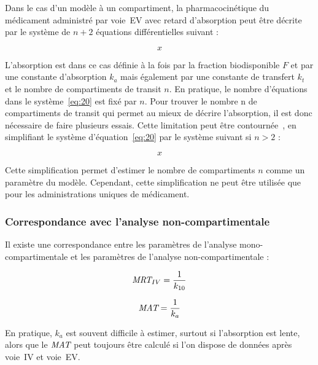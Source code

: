 Dans le cas d'un modèle à un compartiment, la pharmacocinétique du médicament administré par voie~EV avec retard d'absorption peut être décrite par le système de $n+2$ équations différentielles suivant :

\begin{equation}
x
\label{eq:20}
\end{equation}

L'absorption est dans ce cas définie à la fois par la fraction biodisponible $F$ et par une constante d'absorption $k_{a}$ mais également par une constante de transfert $k_t$ et le nombre de compartiments de transit $n$. En pratique, le nombre d'équations dans le système~\ref{eq:20} est fixé par $n$. Pour trouver le nombre n de compartiments de transit qui permet au mieux de décrire l'absorption, il est donc nécessaire de faire plusieurs essais. Cette limitation peut être contournée~\citep{REF1}, en simplifiant le système d'équation~\ref{eq:20} par le système suivant si $n > 2$ :

\begin{equation}
x
\label{eq:21}
\end{equation}

Cette simplification permet d'estimer le nombre de compartiments $n$ comme un paramètre du modèle. Cependant, cette simplification ne peut être utilisée que pour les administrations uniques de médicament.

\subsubsection{Correspondance avec l'analyse non-compartimentale}
Il existe une correspondance entre les paramètres de l'analyse mono-compartimentale et les paramètres de l'analyse non-compartimentale :

\begin{equation}
\operatorname{\textit{MRT}}_{IV} = \frac{1}{k_{10}}
\label{eq:22}
\end{equation}


\begin{equation}
\operatorname{\textit{MAT}} = \frac{1}{k_a}
\label{eq:23}
\end{equation}

En pratique, $k_a$ est souvent difficile à estimer, surtout si l'absorption est lente, alors que le $\operatorname{\textit{MAT}}$ peut toujours être calculé si l'on dispose de données après voie~IV et voie~EV.

